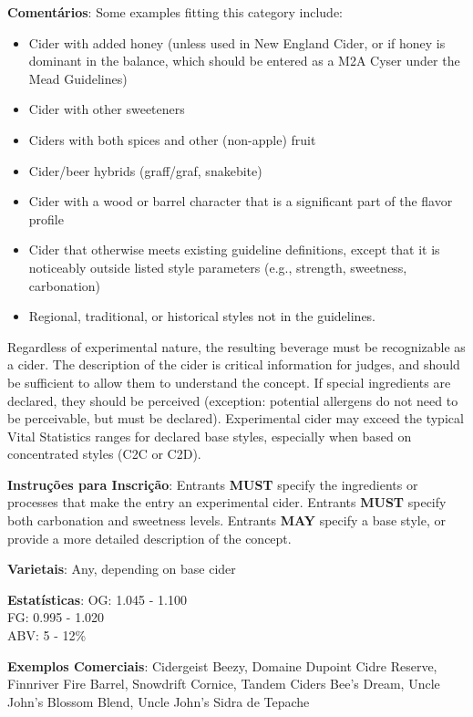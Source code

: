 \textbf{Comentários}: Some examples fitting this category include:
\begin{itemize}[leftmargin=3mm]
\item Cider with added honey (unless used in New England Cider, or if honey is dominant in the balance, which should be entered as a M2A Cyser under the Mead Guidelines)
\item Cider with other sweeteners
\item Ciders with both spices and other (non-apple) fruit
\item Cider/beer hybrids (graff/graf, snakebite)
\item Cider with a wood or barrel character that is a significant part
of the flavor profile
\item Cider that otherwise meets existing guideline definitions,
except that it is noticeably outside listed style parameters
(e.g., strength, sweetness, carbonation)
\item Regional, traditional, or historical styles not in the guidelines.
\end{itemize}
Regardless of experimental nature, the resulting beverage must be recognizable as a cider. The description of the cider is critical information for judges, and should be sufficient to allow them to understand the concept. If special ingredients are declared, they should be perceived (exception: potential allergens do not need to be perceivable, but must be declared).
Experimental cider may exceed the typical Vital Statistics ranges for declared base styles, especially when based on concentrated styles (C2C or C2D).

\textbf{Instruções para Inscrição}: Entrants \textbf{MUST} specify the ingredients or processes that make the entry an experimental cider. Entrants \textbf{MUST} specify both carbonation and sweetness levels. Entrants \textbf{MAY} specify a base style, or provide a more detailed description of the concept.

\textbf{Varietais}: Any, depending on base cider

\textbf{Estatísticas}: OG: 1.045 - 1.100 \\
\phantom{ } \hspace{16.5mm} FG: 0.995 - 1.020 \\
\phantom{ } \hspace{16.5mm} ABV: 5 - 12\%

\textbf{Exemplos Comerciais}: Cidergeist Beezy, Domaine Dupoint Cidre Reserve, Finnriver Fire Barrel, Snowdrift Cornice, Tandem Ciders Bee's Dream, Uncle John's Blossom Blend, Uncle John's Sidra de Tepache
